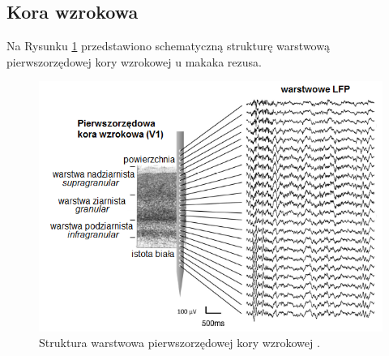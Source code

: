 \documentclass{pracamgr}
\begin{document}
	\subsection{Kora wzrokowa}
	Na Rysunku \ref{rys:warstwy} przedstawiono schematyczną strukturę warstwową pierwszorzędowej kory wzrokowej u makaka rezusa.
	\begin{figure}[htbp]
		\begin{center}
			\includegraphics[scale=0.55]{warstwy.png}
		\end{center}
		\caption{Struktura warstwowa pierwszorzędowej kory wzrokowej \citep{kora_warstwy}.}
		\label{rys:warstwy}
	\end{figure}
	\FloatBarrier
\end{document}
